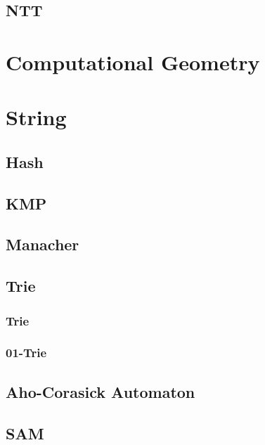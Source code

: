 \documentclass[a4paper]{article}
\begin{document}


\subsection{NTT}



\section{Computational Geometry}



\pagebreak

\section{String}

\subsection{Hash}



\subsection{KMP}



\subsection{Manacher}



\subsection{Trie}

\subsubsection{Trie}



\subsubsection{01-Trie}



\subsection{Aho-Corasick Automaton}


\subsection{SAM}


\end{document}
